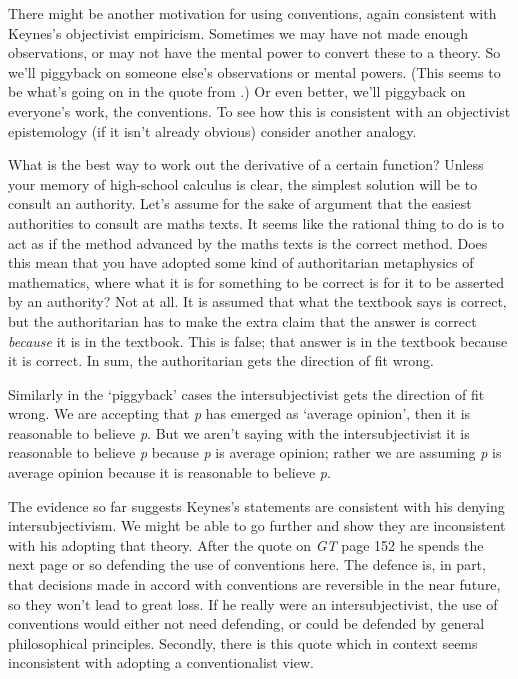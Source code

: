 There might be another motivation for using conventions, again consistent with Keynes's objectivist empiricism. Sometimes we may have not made enough observations, or may not have the mental power to convert these to a theory. So we'll piggyback on someone else's observations or mental powers. (This seems to be what's going on in the quote from \citet{Keynes1937}.) Or even better, we'll piggyback on everyone's work, the conventions. To see how this is consistent with an objectivist epistemology (if it isn't already obvious) consider another analogy.

What is the best way to work out the derivative of a certain function? Unless your memory of high-school calculus is clear, the simplest solution will be to consult an authority. Let's assume for the sake of argument that the easiest authorities to consult are maths texts. It seems like the rational thing to do is to act as if the method advanced by the maths texts is the correct method. Does this mean that you have adopted some kind of authoritarian metaphysics of mathematics, where what it is for something to be correct is for it to be asserted by an authority? Not at all. It is assumed that what the textbook says is correct, but the authoritarian has to make the extra claim that the answer is correct \textit{because} it is in the textbook. This is false; that answer is in the textbook because it is correct. In sum, the authoritarian gets the direction of fit wrong.

Similarly in the `piggyback' cases the intersubjectivist gets the direction of fit wrong. We are accepting that \textit{p} has emerged as `average opinion', then it is reasonable to believe \textit{p}. But we aren't saying with the intersubjectivist it is reasonable to believe \textit{p} because \textit{p} is average opinion; rather we are assuming \textit{p} is average opinion because it is reasonable to believe \textit{p}.

The evidence so far suggests Keynes's statements are consistent with his denying intersubjectivism. We might be able to go further and show they are inconsistent with his adopting that theory. After the quote on \textit{GT} page 152 he spends the next page or so defending the use of conventions here. The defence is, in part, that decisions made in accord with conventions are reversible in the near future, so they won't lead to great loss. If he really were an intersubjectivist, the use of conventions would either not need defending, or could be defended by general philosophical principles. Secondly, there is this quote which in context seems inconsistent with adopting a conventionalist view.

